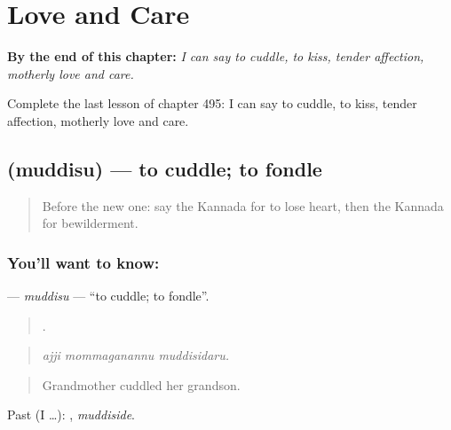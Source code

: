 
\chapter{Love and Care}
\label{ch:ka-love-and-care}

\begin{chapteropening}
\textbf{By the end of this chapter:} \emph{I can say to cuddle, to kiss, tender affection, motherly love and care.}

Complete the last lesson of chapter 495: I can say to cuddle, to kiss, tender affection, motherly love and care.
\end{chapteropening}

\section[\texorpdfstring{\kn{ಮುದ್ದಿಸು} (muddisu)}{ಮುದ್ದಿಸು (muddisu)}]{ (muddisu) — to cuddle; to fondle}

\label{lesson:KA-C495-muddisu}



\begin{quote}
Before the new one: say the Kannada for to lose heart, then the Kannada for bewilderment.
\end{quote}

\subsection*{You'll want to know: }
\textbf{} — \emph{muddisu} — \textquotedblleft{}to cuddle; to fondle\textquotedblright{}.

\begin{quote}
  .
\end{quote}

\begin{quote}
\emph{ajji mommaganannu muddisidaru.}
\end{quote}

\begin{quote}
Grandmother cuddled her grandson.
\end{quote}

Past (I …): , \emph{muddiside}.

